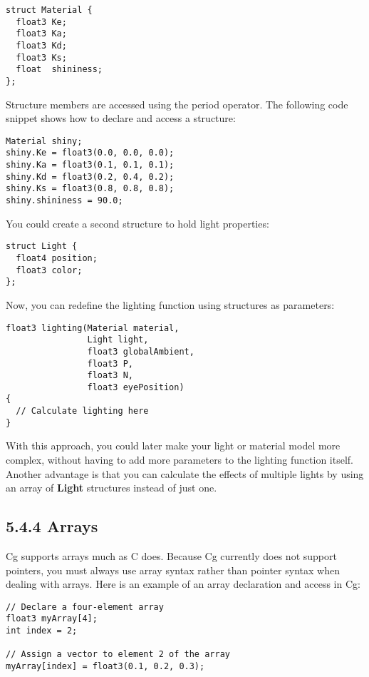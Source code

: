 \documentclass[../main.tex]{subfiles}
\begin{document}
\FloatBarrier
\begin{lstlisting}
struct Material {
  float3 Ke;
  float3 Ka;
  float3 Kd;
  float3 Ks;
  float  shininess;
};
\end{lstlisting}
\FloatBarrier

Structure members are accessed using the period operator. The following code snippet shows how to declare and access a structure:

\FloatBarrier
\begin{lstlisting}
Material shiny;
shiny.Ke = float3(0.0, 0.0, 0.0);
shiny.Ka = float3(0.1, 0.1, 0.1);
shiny.Kd = float3(0.2, 0.4, 0.2);
shiny.Ks = float3(0.8, 0.8, 0.8);
shiny.shininess = 90.0;
\end{lstlisting}
\FloatBarrier

You could create a second structure to hold light properties:

\FloatBarrier
\begin{lstlisting}
struct Light {
  float4 position;
  float3 color;
};
\end{lstlisting}
\FloatBarrier

Now, you can redefine the lighting function using structures as parameters:

\FloatBarrier
\begin{lstlisting}
float3 lighting(Material material,
                Light light,
                float3 globalAmbient,
                float3 P,
                float3 N,
                float3 eyePosition)
{
  // Calculate lighting here
}
\end{lstlisting}
\FloatBarrier

With this approach, you could later make your light or material model more complex, without having to add more parameters to the lighting function itself. Another advantage is that you can calculate the effects of multiple lights by using an array of \textbf{Light} structures instead of just one.

\subsection{5.4.4 Arrays}

Cg supports arrays much as C does. Because Cg currently does not support pointers, you must always use array syntax rather than pointer syntax when dealing with arrays. Here is an example of an array declaration and access in Cg:

\FloatBarrier
\begin{lstlisting}
// Declare a four-element array
float3 myArray[4];
int index = 2;

// Assign a vector to element 2 of the array
myArray[index] = float3(0.1, 0.2, 0.3);
\end{lstlisting}
\FloatBarrier
\end{document}
